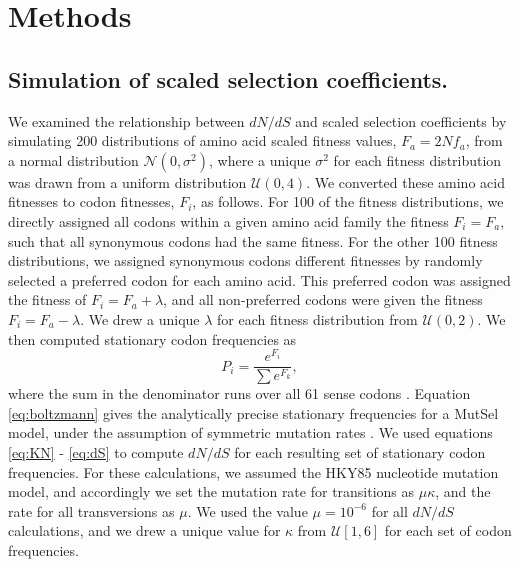 \documentclass[11pt]{article}
\begin{document}
\section*{Methods}

\subsection*{Simulation of scaled selection coefficients.}

We examined the relationship between $dN/dS$ and scaled selection coefficients by simulating 200 distributions of amino acid scaled fitness values, $F_a = 2Nf_a$, from a normal distribution $\mathcal{N}(0,\sigma^2)$, where a unique $\sigma^2$ for each fitness distribution was drawn from a uniform distribution $\mathcal{U}(0,4)$. We converted these amino acid fitnesses to codon fitnesses, $F_i$, as follows. For 100 of the fitness distributions, we directly assigned all codons within a given amino acid family the fitness $F_i = F_a$, such that all synonymous codons had the same fitness. For the other 100 fitness distributions, we assigned synonymous codons different fitnesses by randomly selected a preferred codon for each amino acid. This preferred codon was assigned the fitness of $F_i = F_a + \lambda$, and all non-preferred codons were given the fitness $F_i = F_a - \lambda$. We drew a unique $\lambda$ for each fitness distribution from $\mathcal{U}(0,2)$. 
We then computed stationary codon frequencies as 
\begin{equation}\label{eq:boltzmann}
P_i = \frac{e^{F_i}}{\sum e^{F_k}}, 
\end{equation} where the sum in the denominator runs over all 61 sense codons \cite{SellaHirsh2005}. Equation \eqref{eq:boltzmann} gives the analytically precise stationary frequencies for a MutSel model, under the assumption of symmetric mutation rates \cite{SellaHirsh2005}. We used equations \eqref{eq:KN} - \eqref{eq:dS} to compute $dN/dS$ for each resulting set of stationary codon frequencies. For these calculations, we assumed the HKY85 \cite{HKY85} nucleotide mutation model, and accordingly we set the mutation rate for transitions as $\mu\kappa$, and the rate for all transversions as $\mu$. We used the value $\mu = 10^{-6}$ for all $dN/dS$ calculations, and we drew a unique value for $\kappa$ from $\mathcal{U}[1,6]$ for each set of codon frequencies.
\end{document}

